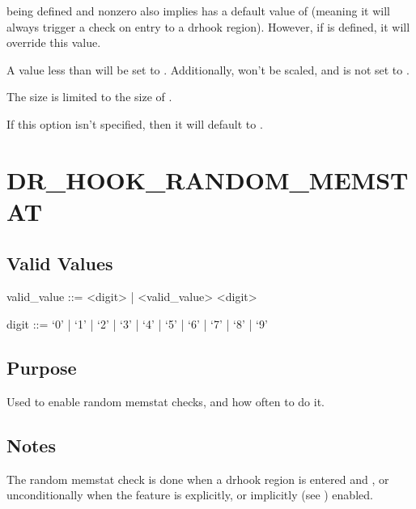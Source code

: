 \documentclass[letterpaper,10pt,english]{sphinxmanual}
\begin{document}
\sphinxAtStartPar
{} being defined and non\sphinxhyphen{}zero also implies  has a default value of  (meaning it will always trigger a  check on entry to a drhook region). However, if {\hyperref[\detokenize{flag/flag:dr-hook-random-memstat}]{}} is defined, it will override this value.

\sphinxAtStartPar
A value less than  will be set to . Additionally,  won’t be scaled, and  is not set to .

\sphinxAtStartPar
The size is limited to the size of .

\sphinxAtStartPar
If this option isn’t specified, then it will default to .


\section{DR\_HOOK\_RANDOM\_MEMSTAT}
\label{\detokenize{flag/flag:dr-hook-random-memstat}}\label{\detokenize{flag/flag:id128}}

\subsection{Valid Values}
\label{\detokenize{flag/flag:id129}}
\begin{DUlineblock}{0em}
\item[] valid\_value ::= \textless{}digit\textgreater{} | \textless{}valid\_value\textgreater{} \textless{}digit\textgreater{}
\item[] digit ::= ‘0’ | ‘1’ | ‘2’ | ‘3’ | ‘4’ | ‘5’ | ‘6’ | ‘7’ | ‘8’ | ‘9’
\end{DUlineblock}


\subsection{Purpose}
\label{\detokenize{flag/flag:id130}}
\sphinxAtStartPar
Used to enable random memstat checks, and how often to do it.


\subsection{Notes}
\label{\detokenize{flag/flag:id131}}
\sphinxAtStartPar
The random memstat check is done when a drhook region is entered and , or unconditionally when the feature is explicitly, or implicitly (see {\hyperref[\detokenize{flag/flag:dr-hook-trace-stack}]{}}) enabled.
\end{document}
